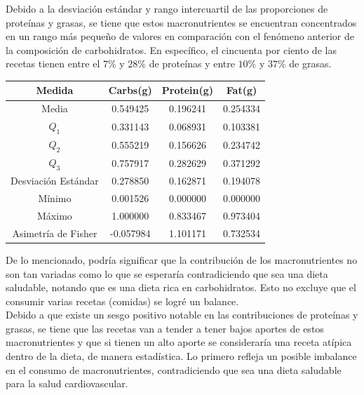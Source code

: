 \documentclass[12pt,a4paper]{article}
\begin{document}
            Debido a la desviación estándar y rango intercuartil de las proporciones 
            de proteínas y grasas, se tiene que estos macronutrientes se encuentran 
            concentrados en un rango más pequeño de valores en comparación con el 
            fenómeno anterior de la composición de carbohidratos. En específico, el 
            cincuenta por ciento de las recetas tienen entre el $7\%$ y $28\%$ de 
            proteínas y entre $10\%$ y $37\%$ de grasas.

            \begin{center}
                \begin{tabular}{| c | c c c |}
                    \toprule
                    Medida & Carbs(g) & Protein(g) & Fat(g) \\
                    \midrule
                    Media               & 0.549425 & 0.196241 & 0.254334  \\
                    $Q_1$               & 0.331143 & 0.068931 & 0.103381  \\
                    $Q_2$               & 0.555219 & 0.156626 & 0.234742  \\
                    $Q_3$               & 0.757917 & 0.282629 &	0.371292  \\
                    Desviación Estándar & 0.278850 & 0.162871 & 0.194078  \\
                    Mínimo              & 0.001526 & 0.000000 & 0.000000  \\
                    Máximo              & 1.000000 & 0.833467 & 0.973404  \\
                    Asimetría de Fisher & -0.057984 & 1.101171 & 0.732534  \\
                    \bottomrule
                \end{tabular}
            \end{center}

            De lo mencionado, podría significar que la contribución de los macronutrientes 
            no son tan variadas como lo que se esperaría contradiciendo que sea una 
            dieta saludable, notando que es una dieta rica en carbohidratos. Esto no 
            excluye que el consumir varias recetas (comidas) se logré un balance.\\

            Debido a que existe un sesgo positivo notable en las contribuciones de 
            proteínas y grasas, se tiene que las recetas van a tender a tener bajos 
            aportes de estos macronutrientes y que si tienen un alto aporte se 
            consideraría una receta atípica dentro de la dieta, de manera estadística. 
            Lo primero refleja un posible imbalance en el consumo de macronutrientes, 
            contradiciendo que sea una dieta saludable para la salud cardiovascular.
\end{document}
